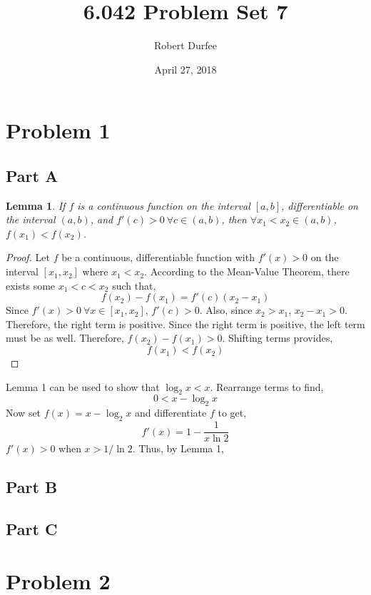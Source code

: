 \documentclass{article}
\title{6.042 Problem Set 7}
\author{Robert Durfee}
\date{April 27, 2018}
\newtheorem{lemma}[theorem]{Lemma}
\begin{document}
\maketitle

\section*{Problem 1}

\subsection*{Part A}

\begin{lemma}
  If $f$ is a continuous function on the interval $[a, b]$, differentiable on
  the interval $(a, b)$, and $f'(c) > 0\ \forall c \in (a, b)$, then $\forall
  x_1 < x_2 \in (a, b)$, $f(x_1) < f(x_2)$.
\end{lemma}

\begin{proof}
  Let $f$ be a continuous, differentiable function with $f'(x) > 0$ on the
  interval $[x_1, x_2]$ where $x_1 < x_2$. According to the Mean-Value Theorem,
  there exists some $x_1 < c < x_2$ such that,
  $$ f(x_2) - f(x_1) = f'(c)(x_2 - x_1) $$
  Since $f'(x) > 0\ \forall x \in [x_1, x_2]$, $f'(c) > 0$. Also, since $x_2 >
  x_1$, $x_2 - x_1 > 0$. Therefore, the right term is positive. Since the right
  term is positive, the left term must be as well. Therefore, $f(x_2) - f(x_1) >
  0$.  Shifting terms provides,
  $$ f(x_1) < f(x_2) $$
\end{proof}

Lemma 1 can be used to show that $\log_2 x < x$. Rearrange terms to find,
$$ 0 < x - \log_2 x $$
Now set $f(x) = x - \log_2 x$ and differentiate $f$ to get,
$$ f'(x) = 1 - \frac{1}{x \ln 2} $$
$f'(x) > 0$ when $x > 1 / \ln 2$. Thus, by Lemma 1, 

\break

\subsection*{Part B}

\break

\subsection*{Part C}

\break

\section*{Problem 2}
\end{document}
